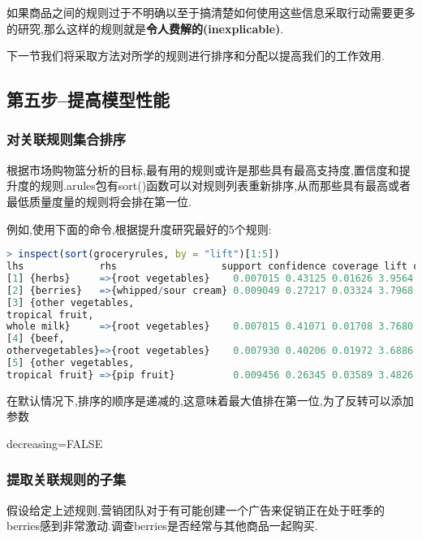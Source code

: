 \documentclass[11pt,a4paper,oneside]{book}
\begin{document}
如果商品之间的规则过于不明确以至于搞清楚如何使用这些信息采取行动需要更多的研究,那么这样的规则就是\textbf{令人费解的(inexplicable)}.

下一节我们将采取方法对所学的规则进行排序和分配以提高我们的工作效用.

\subsection{第五步--提高模型性能}
\subsubsection{对关联规则集合排序}
根据市场购物篮分析的目标,最有用的规则或许是那些具有最高支持度,置信度和提升度的规则.arules包有sort()函数可以对规则列表重新排序,从而那些具有最高或者最低质量度量的规则将会排在第一位.

例如,使用下面的命令,根据提升度研究最好的5个规则:
\begin{lstlisting}[language=r]
> inspect(sort(groceryrules, by = "lift")[1:5])
lhs             rhs                  support confidence coverage lift count
[1] {herbs}     =>{root vegetables}    0.007015 0.43125 0.01626 3.9564 69
[2] {berries}   =>{whipped/sour cream} 0.009049 0.27217 0.03324 3.7968 89
[3] {other vegetables,                                                                         
tropical fruit,                                                                           
whole milk}     =>{root vegetables}    0.007015 0.41071 0.01708 3.7680 69
[4] {beef,                                                                                     
othervegetables}=>{root vegetables}    0.007930 0.40206 0.01972 3.6886 78
[5] {other vegetables,                                                                         
tropical fruit} =>{pip fruit}          0.009456 0.26345 0.03589 3.4826 93
\end{lstlisting}

\begin{tcolorbox}[colback=pink!10!white,colframe=pink!100!black]
在默认情况下,排序的顺序是递减的,这意味着最大值排在第一位,为了反转可以添加参数

decreasing=FALSE
\end{tcolorbox}

\subsubsection{提取关联规则的子集}

假设给定上述规则,营销团队对于有可能创建一个广告来促销正在处于旺季的berries感到非常激动.调查berries是否经常与其他商品一起购买.
\end{document}
